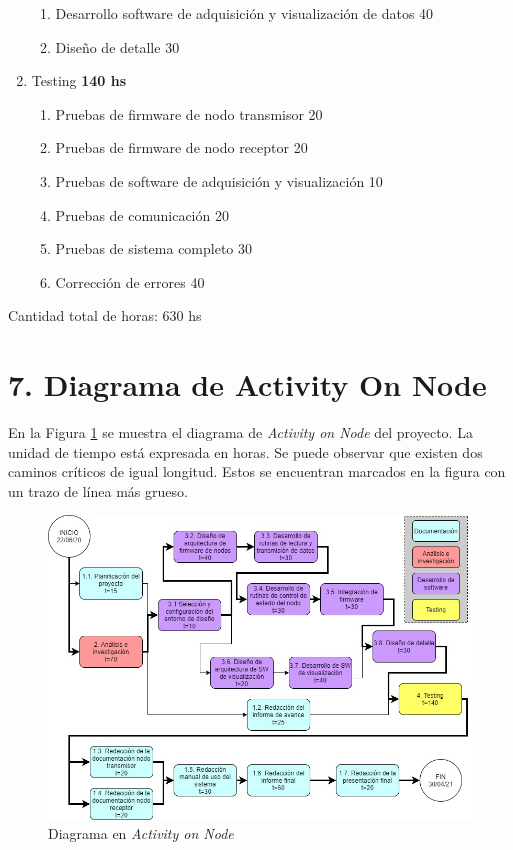 \documentclass[11pt]{charter}
\begin{document}
\begin{enumerate}
\begin{enumerate}
	\item Desarrollo software de adquisición y visualización de datos			\hfill 40
	\item Diseño de detalle														\hfill 30
	\end{enumerate}
\item Testing																	\hfill \textbf{140 hs}
	\begin{enumerate}
	\item Pruebas de firmware de nodo transmisor								\hfill 20
	\item Pruebas de firmware de nodo receptor									\hfill 20
	\item Pruebas de software de adquisición y visualización					\hfill 10
	\item Pruebas de comunicación												\hfill 20
	\item Pruebas de sistema completo											\hfill 30
	\item Corrección de errores													\hfill 40
	\end{enumerate}
\end{enumerate}

Cantidad total de horas: 630 hs

\newpage 
\section{7. Diagrama de Activity On Node}
\label{sec:AoN}

En la Figura \ref{fig:AoN} se muestra el diagrama de \textit{Activity on Node} del proyecto. La unidad de tiempo está expresada en horas.
Se puede observar que existen dos caminos críticos de igual longitud. Estos se encuentran marcados en la figura con un trazo de línea más grueso.
\begin{figure}[htpb]
\centering 
\includegraphics[width=.8\textwidth]{./Figuras/AON.jpg}
\caption{Diagrama en \textit{Activity on Node}}
\label{fig:AoN}
\end{figure}
\end{document}
